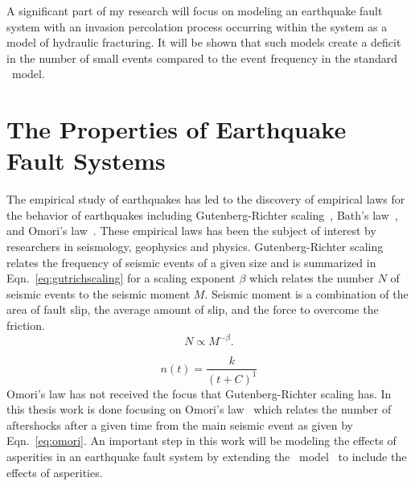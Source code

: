 A significant part of my research  will focus on modeling an earthquake fault system with an invasion percolation process occurring within the system as a model of hydraulic fracturing. It will be shown that such models create a deficit in the number of small events compared to the event frequency in the standard \ofc\ model. 


\section{The Properties of Earthquake Fault Systems}

The empirical study of earthquakes has led to the discovery  of empirical laws for the behavior of earthquakes including Gutenberg-Richter scaling~\cite{gr56}, Bath's law~\cite{bath65}, and Omori's law~\cite{omori94}. These empirical laws has been the subject of interest by researchers in seismology, geophysics and physics. Gutenberg-Richter scaling relates the frequency of seismic events of a given size and is summarized in Eqn.~\eqref{eq:gutrichscaling} for a scaling exponent $\beta$ which relates the number $N$ of seismic events to the seismic moment $M$. Seismic moment is a combination of the area of fault slip, the average amount of slip, and the force to overcome the friction.
\begin{equation}
 \label{eq:gutrichscaling}
	N \propto M^{-\beta}.
\end{equation}

\begin{equation}
 \label{eq:omori}
	n(t) = \frac{k}{(t+C)^1}
\end{equation} %
% 
Omori's law has not received the focus that  Gutenberg-Richter scaling has. In this thesis work is done focusing on Omori's law~\cite{omori94} which relates the number of aftershocks after a given time from the main seismic event as given by Eqn.~\eqref{eq:omori}. An important step in this work will be modeling the effects of asperities in an earthquake fault system by extending the \ofc\ model~\cite{ofc92} to include the effects of asperities. 

